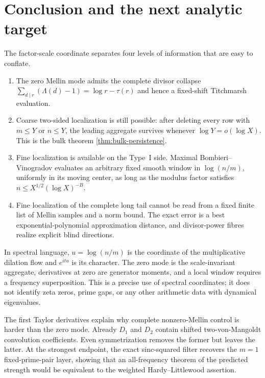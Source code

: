 \section{Conclusion and the next analytic target}
\label{sec:conclusion}

The factor-scale coordinate separates four levels of information that are
easy to conflate.

\begin{enumerate}[label=\textup{(\roman*)}]
 \item The zero Mellin mode admits the complete divisor collapse
 \(
  \sum_{d\mid r}(\Lambda(d)-1)=\log r-\tau(r)
 \)
 and hence a fixed-shift Titchmarsh evaluation.

 \item Coarse two-sided localization is still possible: after deleting
 every row with $m\leq Y$ or $n\leq Y$, the leading aggregate survives
 whenever $\log Y=o(\log X)$.  This is the bulk theorem
 \cref{thm:bulk-persistence}.

 \item Fine localization is available on the Type~I side.  Maximal
 Bombieri--Vinogradov evaluates an arbitrary fixed smooth window in
 $\log(n/m)$, uniformly in its moving center, as long as the modulus
 factor satisfies $n\leq X^{1/2}(\log X)^{-B}$.

 \item Fine localization of the complete long tail cannot be read from a
 fixed finite list of Mellin samples and a norm bound.  The exact error is
 a best exponential-polynomial approximation distance, and divisor-power
 fibres realize explicit blind directions.
\end{enumerate}

In spectral language, $u=\log(n/m)$ is the coordinate of the multiplicative
dilation flow and $e^{itu}$ is its character.  The zero mode is the
scale-invariant aggregate, derivatives at zero are generator moments, and
a local window requires a frequency superposition.  This is a precise use
of spectral coordinates; it does not identify zeta zeros, prime gaps, or
any other arithmetic data with dynamical eigenvalues.

The first Taylor derivatives explain why complete nonzero-Mellin control is
harder than the zero mode.  Already $D_1$ and $D_2$ contain shifted
two-von-Mangoldt convolution coefficients.  Even symmetrization removes
the former but leaves the latter.  At the strongest endpoint, the exact
sinc-squared filter recovers the $m=1$ fixed-prime-pair layer, showing that
an all-frequency theorem of the predicted strength would be equivalent to
the weighted Hardy--Littlewood assertion.

